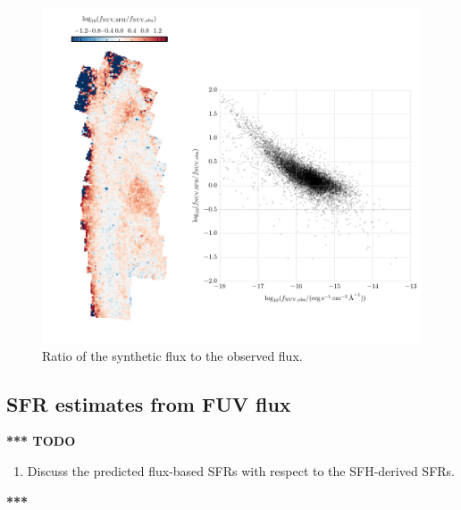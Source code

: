 \begin{figure}
\centering
\includegraphics[width=\textwidth]{m31flux-figures/flux_nuv_sfh-vs-obs.pdf}
\caption[Ratio of the synthetic \nuv{} flux to the observed \nuv{} flux.]{Ratio
    of the synthetic \nuv{} flux to the observed \nuv{} flux.
}
\label{fig:mfx:nuvfluxratio}
\end{figure}



\subsection{SFR estimates from FUV flux}

\textbf{*** TODO}

\begin{enumerate}
\item Discuss the predicted flux-based SFRs with respect to the SFH-derived
    SFRs.
\end{enumerate}

\textbf{***}


